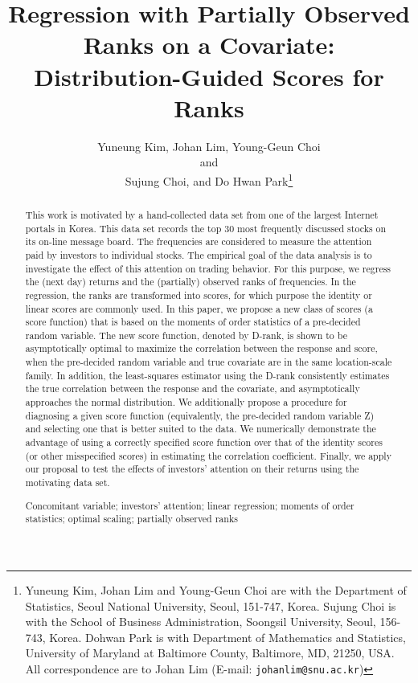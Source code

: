 \documentclass[12pt]{article}
\begin{document}
\title{Regression with Partially Observed Ranks on a Covariate: \\
Distribution-Guided Scores for Ranks}

\date{}

\date{}
\author{Yuneung Kim, Johan Lim, Young-Geun Choi\\
and \\
Sujung Choi, and Do Hwan Park\thanks{
Yuneung Kim, Johan Lim and Young-Geun Choi 
are with the Department of Statistics, Seoul National University, Seoul, 151-747, Korea. 
 Sujung Choi is with the School of Business Administration, Soongsil University, Seoul, 156-743, Korea.
 Dohwan Park is with Department of Mathematics and Statistics, University of Maryland at Baltimore 
 County, Baltimore, MD, 21250, USA. 
 All correspondence  are to Johan Lim (E-mail: \texttt{johanlim@snu.ac.kr})}}
\maketitle
\begin{abstract}
\noindent This work is motivated by a hand-collected data set from one of the largest
Internet portals in Korea. This data set records the top 30 most frequently
discussed stocks on its on-line message board. The frequencies are 
considered to measure the attention paid by investors to individual stocks. The empirical goal
of the data analysis is to investigate the effect of this attention on trading behavior.
For this purpose, we regress the (next day) returns and the (partially) observed ranks of
frequencies. In the regression, the ranks are transformed into scores, for which purpose the
 identity or linear scores are commonly used.
In this paper, we propose a new class of scores 
(a score function) that is based on the moments of order statistics of a pre-decided random 
variable. The new score function, denoted by D-rank, is shown to be asymptotically optimal to 
maximize the correlation between 
the response and score, when the pre-decided random variable and true covariate
are in the same location-scale family. In addition, the least-squares estimator using the D-rank 
consistently estimates the true correlation between
the response and the covariate, and asymptotically approaches the normal distribution.
We additionally propose a procedure for diagnosing a given score function (equivalently,
the pre-decided random variable Z) and selecting
one that is better suited to the data. 
We numerically demonstrate the advantage of using a correctly specified score function 
over that of the identity scores (or other misspecified scores) 
in estimating the correlation coefficient. Finally, we apply our proposal
to test the effects of investors' attention on their returns using the motivating 
data set. 

\vskip0.5cm
 Concomitant variable; investors' attention; linear 
regression; moments of order statistics; optimal scaling; partially observed ranks 
\end{abstract}
\end{document}
